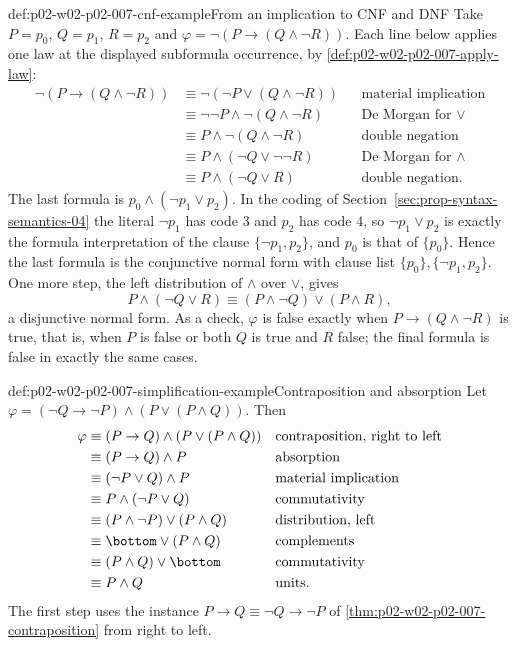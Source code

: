 \begin{hbexample}{def:p02-w02-p02-007-cnf-example}{From an implication to CNF and DNF}
Take \(P=p_0\), \(Q=p_1\), \(R=p_2\) and
\(\varphi=\neg(P\to(Q\land\neg R))\).  Each line below applies one law at
the displayed subformula occurrence, by
\cref{def:p02-w02-p02-007-apply-law}:
\[
\begin{aligned}
 \neg(P\to(Q\land\neg R))
   &\equiv\neg(\neg P\lor(Q\land\neg R))
   &&\text{material implication}\\
   &\equiv\neg\neg P\land\neg(Q\land\neg R)
   &&\text{De Morgan for }\lor\\
   &\equiv P\land\neg(Q\land\neg R)
   &&\text{double negation}\\
   &\equiv P\land(\neg Q\lor\neg\neg R)
   &&\text{De Morgan for }\land\\
   &\equiv P\land(\neg Q\lor R)
   &&\text{double negation.}
\end{aligned}
\]
The last formula is \(p_0\land(\neg p_1\lor p_2)\).  In the coding of
Section~\ref{sec:prop-syntax-semantics-04} the literal \(\neg p_1\) has code
\(3\) and \(p_2\) has code \(4\), so \(\neg p_1\lor p_2\) is exactly the
formula interpretation of the clause \(\{\neg p_1,p_2\}\), and \(p_0\) is
that of \(\{p_0\}\).  Hence the last formula is the conjunctive normal form
with clause list \(\{p_0\},\{\neg p_1,p_2\}\).  One more step, the left
distribution of \(\land\) over \(\lor\), gives
\[
 P\land(\neg Q\lor R)\equiv(P\land\neg Q)\lor(P\land R),
\]
a disjunctive normal form.  As a check, \(\varphi\) is false exactly when
\(P\to(Q\land\neg R)\) is true, that is, when \(P\) is false or both \(Q\)
is true and \(R\) false; the final formula is false in exactly the same
cases.
\end{hbexample}

\begin{hbexample}{def:p02-w02-p02-007-simplification-example}{Contraposition and absorption}
Let \(\varphi=(\neg Q\to\neg P)\land(P\lor(P\land Q))\).  Then
\[
\begin{aligned}
 \varphi
   &\equiv(P\to Q)\land(P\lor(P\land Q))
   &&\text{contraposition, right to left}\\
   &\equiv(P\to Q)\land P
   &&\text{absorption}\\
   &\equiv(\neg P\lor Q)\land P
   &&\text{material implication}\\
   &\equiv P\land(\neg P\lor Q)
   &&\text{commutativity}\\
   &\equiv(P\land\neg P)\lor(P\land Q)
   &&\text{distribution, left}\\
   &\equiv\bottom\lor(P\land Q)
   &&\text{complements}\\
   &\equiv(P\land Q)\lor\bottom
   &&\text{commutativity}\\
   &\equiv P\land Q
   &&\text{units.}
\end{aligned}
\]
The first step uses the instance
\(P\to Q\equiv\neg Q\to\neg P\) of \cref{thm:p02-w02-p02-007-contraposition}
from right to left.
\end{hbexample}


